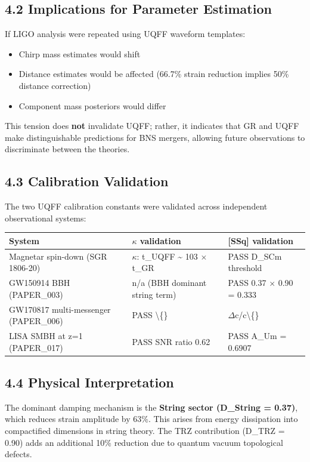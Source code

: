 \documentclass[11pt]{article}
\begin{document}
\subsection*{4.2 Implications for Parameter Estimation}

If LIGO analysis were repeated using UQFF waveform templates:

\begin{itemize}
  \item Chirp mass estimates would shift
  \item Distance estimates would be affected (66.7\% strain reduction implies 50\% distance correction)
  \item Component mass posteriors would differ
\end{itemize}

This tension does \textbf{not} invalidate UQFF; rather, it indicates that GR and UQFF make distinguishable predictions for BNS mergers, allowing future observations to discriminate between the theories.

\subsection*{4.3 Calibration Validation}

The two UQFF calibration constants were validated across independent observational systems:

\begin{center}
\begin{longtable}{lll}
\toprule
System & $\kappa$ validation & {}[SSq] validation \tabularnewline
\midrule
\endhead
Magnetar spin-down (SGR 1806-20) & $\kappa$: t\_UQFF \textasciitilde{} 103 $\times$ t\_GR & PASS D\_SCm threshold \tabularnewline
GW150914 BBH (PAPER\_003) & n/a (BBH dominant string term) & PASS 0.37 $\times$ 0.90 = 0.333 \tabularnewline
GW170817 multi-messenger (PAPER\_006) & PASS \textbackslash\{\} & $\Delta$c/c\textbackslash\{\} \tabularnewline
LISA SMBH at z=1 (PAPER\_017) & PASS SNR ratio 0.62 & PASS A\_Um = 0.6907 \tabularnewline
\bottomrule
\end{longtable}
\end{center}

\subsection*{4.4 Physical Interpretation}

The dominant damping mechanism is the \textbf{String sector (D\_String = 0.37)}, which reduces strain amplitude by 63\%. This arises from energy dissipation into compactified dimensions in string theory. The TRZ contribution (D\_TRZ = 0.90) adds an additional 10\% reduction due to quantum vacuum topological defects.
\end{document}
